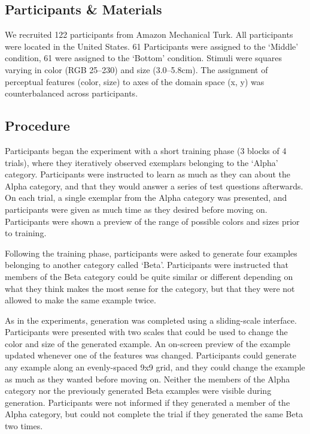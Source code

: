 \documentclass[10pt,letterpaper]{article}
\begin{document}

\subsection{Participants \& Materials}

We recruited 122 participants from Amazon Mechanical Turk. All participants were located in the United States. 61 Participants were assigned to the `Middle' condition, 61 were assigned to the `Bottom' condition. Stimuli were squares varying in color (RGB 25--230) and size (3.0--5.8cm). The assignment of perceptual features (color, size) to axes of the domain space (x, y) was counterbalanced across participants.

\subsection{Procedure}

Participants began the experiment with a short training phase (3 blocks of 4 trials), where they iteratively observed exemplars belonging to the `Alpha' category. Participants were instructed to learn as much as they can about the Alpha category, and that they would answer a series of test questions afterwards. On each trial, a single exemplar from the Alpha category was presented, and participants were given as much time as they desired before moving on. Participants were shown a preview of the range of possible colors and sizes prior to training.

Following the training phase, participants were asked to generate four examples belonging to another category called `Beta'. Participants were instructed that members of the Beta category could be quite similar or different depending on what they think makes the most sense for the category, but that they were not allowed to make the same example twice. 

As in the \citet{jern2013probabilistic} experiments, generation was completed using a sliding-scale interface. Participants were presented with two scales that could be used to change the color and size of the generated example. An on-screen preview of the example updated whenever one of the features was changed. Participants could generate any example along an evenly-spaced 9x9 grid, and they could change the example as much as they wanted before moving on. Neither the members of the Alpha category nor the previously generated Beta examples were visible during generation. Participants were not informed if they generated a member of the Alpha category, but could not complete the trial if they generated the same Beta two times.
\end{document}
